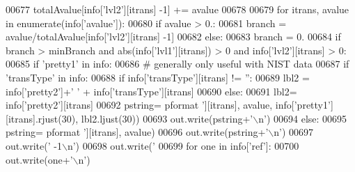 \begin{DoxyCode}
{{{{{{{{{{{{00677             totalAvalue[info[\textcolor{stringliteral}{'lvl2'}][itrans] -1] += avalue
00678 
00679     \textcolor{keywordflow}{for} itrans, avalue \textcolor{keywordflow}{in} enumerate(info[\textcolor{stringliteral}{'avalue'}]):
00680         \textcolor{keywordflow}{if} avalue > 0.:
00681             branch = avalue/totalAvalue[info[\textcolor{stringliteral}{'lvl2'}][itrans] -1]
00682         \textcolor{keywordflow}{else}:
00683             branch = 0.
00684         \textcolor{keywordflow}{if} branch > minBranch \textcolor{keywordflow}{and} abs(info[\textcolor{stringliteral}{'lvl1'}][itrans]) > 0 \textcolor{keywordflow}{and} info[\textcolor{stringliteral}{'lvl2'}][itrans] > 0:
00685             \textcolor{keywordflow}{if} \textcolor{stringliteral}{'pretty1'} \textcolor{keywordflow}{in} info:
00686                 \textcolor{comment}{# generally only useful with NIST data}
00687                 \textcolor{keywordflow}{if} \textcolor{stringliteral}{'transType'} \textcolor{keywordflow}{in} info:
00688                     \textcolor{keywordflow}{if} info[\textcolor{stringliteral}{'transType'}][itrans] != \textcolor{stringliteral}{''}:
00689                         lbl2 = info[\textcolor{stringliteral}{'pretty2'}]+\textcolor{stringliteral}{'  '} + info[\textcolor{stringliteral}{'transType'}][itrans]
00690                 \textcolor{keywordflow}{else}:
00691                     lbl2= info[\textcolor{stringliteral}{'pretty2'}][itrans]
00692                 pstring= pformat%
      '}][itrans], avalue, info[\textcolor{stringliteral}{'pretty1'}][itrans].rjust(30), lbl2.ljust(30))
00693                 out.write(pstring+\textcolor{stringliteral}{'\(\backslash\)n'})
00694             \textcolor{keywordflow}{else}:
00695                 pstring= pformat%
      '}][itrans], avalue)
00696                 out.write(pstring+\textcolor{stringliteral}{'\(\backslash\)n'})
00697     out.write(\textcolor{stringliteral}{' -1\(\backslash\)n'})
00698     out.write(\textcolor{stringliteral}{'%
00699     \textcolor{keywordflow}{for} one \textcolor{keywordflow}{in} info[\textcolor{stringliteral}{'ref'}]:
00700         out.write(one+\textcolor{stringliteral}{'\(\backslash\)n'})
}}}}}}}}}}}
\end{DoxyCode}
